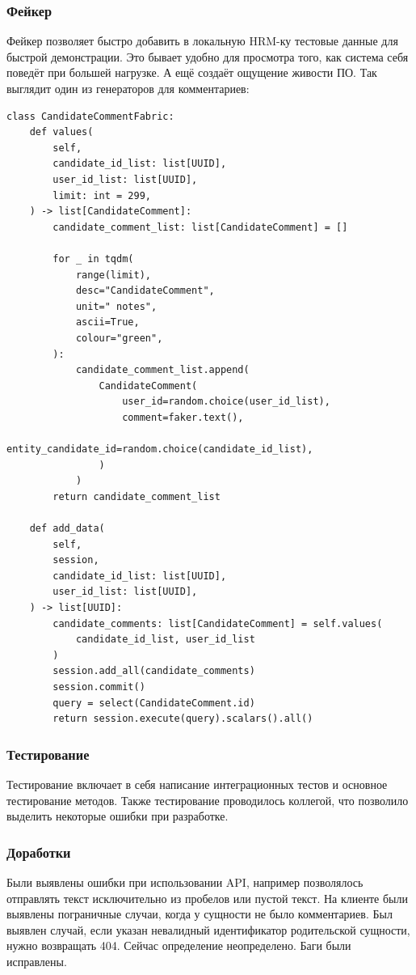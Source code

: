 \documentclass[a4paper,14pt]{extarticle}
\begin{document}
\subsubsection{Фейкер}

Фейкер позволяет быстро добавить в локальную HRM-ку тестовые данные для быстрой демонстрации. Это бывает 
удобно для просмотра того, как система себя поведёт при большей нагрузке. А ещё создаёт ощущение живости 
ПО. Так выглядит один из генераторов для комментариев:

\begin{verbatim}
class CandidateCommentFabric:
    def values(
        self,
        candidate_id_list: list[UUID],
        user_id_list: list[UUID],
        limit: int = 299,
    ) -> list[CandidateComment]:
        candidate_comment_list: list[CandidateComment] = []

        for _ in tqdm(
            range(limit),
            desc="CandidateComment",
            unit=" notes",
            ascii=True,
            colour="green",
        ):
            candidate_comment_list.append(
                CandidateComment(
                    user_id=random.choice(user_id_list),
                    comment=faker.text(),
                    entity_candidate_id=random.choice(candidate_id_list),
                )
            )
        return candidate_comment_list

    def add_data(
        self,
        session,
        candidate_id_list: list[UUID],
        user_id_list: list[UUID],
    ) -> list[UUID]:
        candidate_comments: list[CandidateComment] = self.values(
            candidate_id_list, user_id_list
        )
        session.add_all(candidate_comments)
        session.commit()
        query = select(CandidateComment.id)
        return session.execute(query).scalars().all()
\end{verbatim}

\subsubsection{Тестирование}
Тестирование включает в себя написание интеграционных тестов и основное тестирование методов. Также 
тестирование проводилось коллегой, что позволило выделить некоторые ошибки при разработке.
\subsubsection{Доработки}
Были выявлены ошибки при использовании API, например позволялось отправлять текст исключительно из 
пробелов или пустой текст. На клиенте были выявлены пограничные случаи, когда у сущности не было комментариев.
Был выявлен случай, если указан невалидный идентификатор родительской сущности, нужно возвращать 404. Сейчас 
определение неопределено. Баги были исправлены.
\end{document}

